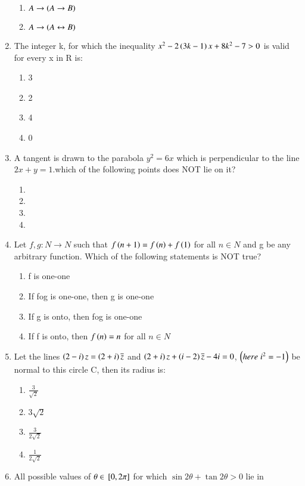 \documentclass[journal,12pt,twocolumn]{IEEEtran}
\theoremstyle{remark}
\begin{document}
\begin{enumerate}
\begin{enumerate}
    \item $A\to\left(A\to B\right)$
    \item $A\to\left(A\leftrightarrow B\right)$
\end{enumerate}
\item The integer k, for which the inequality $x^{2}-2\left(3k-1\right)x+8k^{2}-7>0$ is valid for every x in R is$\colon$
\begin{enumerate}
    \item 3
    \item 2
    \item 4
    \item 0
\end{enumerate}
\item A tangent is drawn to the parabola $y^{2}=6x$ which is perpendicular to the line $2x+y=1$.which of the following points does NOT lie on it?
\begin{enumerate}
    \item {}
    \item {}
    \item {}
    \item {}
\end{enumerate}
\item Let $f,g\colon N\to N$ such that $f\left(n+1\right)=f\left(n\right)+f\left(1\right)$ for all $n\in N$ and g be any arbitrary function. Which of the following statements is NOT true?
\begin{enumerate}
    \item f is one-one
    \item If fog is one-one, then g is one-one
    \item If g is onto, then fog is one-one
    \item If f is onto, then $f\left(n\right)=n$ for all $n \in N$
\end{enumerate}
\item Let the lines $\left(2-i\right)z=\left(2+i\right)\overline{z}$ and $\left(2+i\right)z+\left(i-2\right)\overline{z}-4i=0$, $\left(here\; i^{2}=-1\right)$ be normal to this circle C, then its radius is$\colon$
\begin{enumerate}
    \item $\frac{3}{\sqrt{2}}$
    \item $3\sqrt{2}$
    \item $\frac{3}{2\sqrt{2}}$
    \item $\frac{1}{2\sqrt{2}}$
\end{enumerate}
\item All possible values of $\theta\in{}\left[0,2\pi\right]$ for which $\sin2\theta+\tan2\theta>0$ lie in

\end{enumerate}
\end{document}
